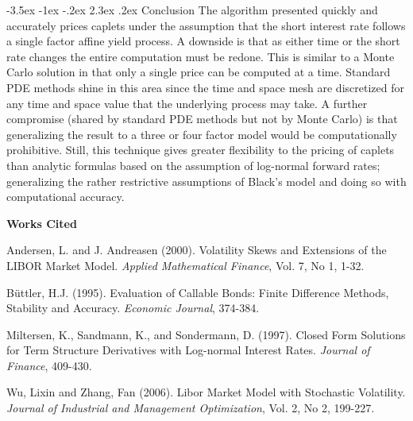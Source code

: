 \documentclass[12pt]{article}
\makeatletter
\renewcommand\section{\@startsection{section}{1}{\z@}%
                                  {-3.5ex \@plus -1ex \@minus -.2ex}%
                                  {2.3ex \@plus.2ex}%
                                  {\normalfont\large\bfseries}}
\newcommand{\bibent}{\noindent \hangindent 40pt}
\newenvironment{workscited}{\newpage \begin{center} \large{\textbf{Works Cited}} \end{center}}{\newpage }
\theoremstyle{definition}
\theoremstyle{remark}
\makeatother
\begin{document}
\section{Conclusion}
The algorithm presented quickly and accurately prices caplets under the assumption that the short interest rate follows a single factor affine yield process.   A downside is that as either time or the short rate changes the entire computation must be redone.  This is similar to a Monte Carlo solution in that only a single price can be computed at a time. Standard PDE methods shine in this area since the time and space mesh are discretized for any time and space value that the underlying process may take. A further compromise (shared by standard PDE methods but not by Monte Carlo) is that generalizing the result to a three or four factor model would be computationally prohibitive. Still, this technique gives greater flexibility to the pricing of caplets than analytic formulas based on the assumption of log-normal forward rates; generalizing the rather restrictive assumptions of Black's model and doing so with computational accuracy.        

\begin{workscited}


\bibent
Andersen, L. and J. Andreasen (2000). Volatility Skews and Extensions of the LIBOR Market
Model. \emph{Applied Mathematical Finance}, Vol. 7, No 1, 1-32.

\bibent
B\"{u}ttler, H.J. (1995). Evaluation of Callable Bonds: Finite Difference Methods, Stability and Accuracy. \emph{Economic Journal}, 374-384.

\bibent
Miltersen, K., Sandmann, K., and Sondermann, D. (1997). Closed
Form Solutions for Term Structure Derivatives with Log-normal Interest
Rates. \emph{Journal of Finance}, 409-430.

\bibent
Wu, Lixin and Zhang, Fan (2006).  Libor Market Model with Stochastic Volatility.  \emph{Journal of Industrial and Management Optimization}, Vol. 2, No 2, 199-227.

\end{workscited}
\appendix
%

%
\end{document}

